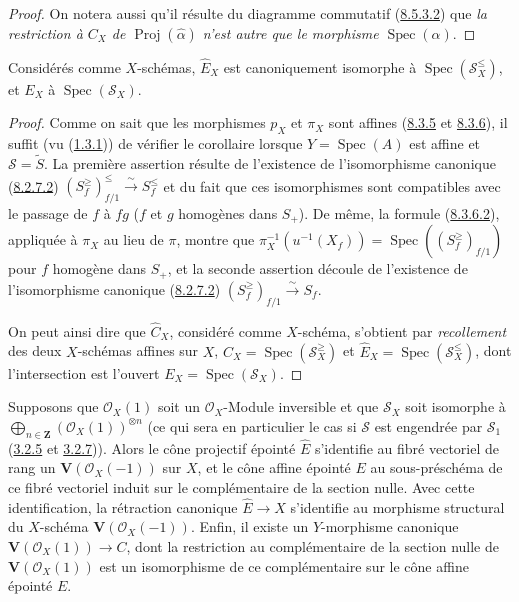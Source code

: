 \begin{proof}
On notera aussi qu'il résulte du diagramme commutatif
(\hyperref[II.8.5.3.2-fr]{8.5.3.2}) que \emph{la restriction à $C_X$ de
$\operatorname{Proj}(\widehat{\alpha})$ n'est autre que le morphisme
$\operatorname{Spec}(\alpha)$}.
\end{proof}

\begin{corollary}[8.6.3]
\label{II.8.6.3-fr}
Considérés comme $X$-schémas, $\widehat{E}_X$ est canoniquement isomorphe à
$\operatorname{Spec}(\mathcal{S}_X^{\leq})$, et $E_X$ à
$\operatorname{Spec}(\mathcal{S}_X)$.
\end{corollary}

\begin{proof}
Comme on sait que les morphismes $p_X$ et $\pi_X$ sont affines
(\hyperref[II.8.3.5-fr]{8.3.5} et
\hyperref[II.8.3.6-fr]{8.3.6}), il suffit (vu
(\hyperref[II.1.3.1-fr]{1.3.1})) de vérifier le corollaire lorsque
$Y=\operatorname{Spec}(A)$ est affine et $\mathcal{S}=\widetilde{S}$. La
première assertion résulte de l'existence de l'isomorphisme canonique
(\hyperref[II.8.2.7.2-fr]{8.2.7.2})
$(S_f^{\geq})_{f/1}^{\leq}\xrightarrow{\sim}S_f^{\leq}$ et du fait que ces
isomorphismes sont compatibles avec le passage de $f$ à $fg$ ($f$ et $g$
homogènes dans $S_+$). De même, la formule
(\hyperref[II.8.3.6.2-fr]{8.3.6.2}), appliquée à $\pi_X$ au lieu de $\pi$,
montre que
$\pi_X^{-1}(u^{-1}(X_f))=
\operatorname{Spec}((S_f^{\geq})_{f/1})$ pour $f$ homogène dans $S_+$, et la
seconde assertion découle de l'existence de l'isomorphisme canonique
(\hyperref[II.8.2.7.2-fr]{8.2.7.2})
$(S_f^{\geq})_{f/1}\xrightarrow{\sim}S_f$.

On peut ainsi dire que $\widehat{C}_X$, considéré comme $X$-schéma, s'obtient
par \emph{recollement} des deux $X$-schémas affines sur $X$,
$C_X=\operatorname{Spec}(\mathcal{S}_X^{\geq})$ et
$\widehat{E}_X=\operatorname{Spec}(\mathcal{S}_X^{\leq})$, dont
l'intersection est l'ouvert $E_X=\operatorname{Spec}(\mathcal{S}_X)$.
\end{proof}

\begin{corollary}[8.6.4]
\label{II.8.6.4-fr}
Supposons que $\mathcal{O}_X(1)$ soit un $\mathcal{O}_X$-Module inversible et
que $\mathcal{S}_X$ soit isomorphe à
$\bigoplus_{n\in\mathbf{Z}}(\mathcal{O}_X(1))^{\otimes n}$ (ce qui sera en
particulier le cas si $\mathcal{S}$ est engendrée par $\mathcal{S}_1$
\textup{(\hyperref[II.3.2.5-fr]{3.2.5}} et
\textup{\hyperref[II.3.2.7-fr]{3.2.7}))}. Alors le cône projectif épointé
$\widehat{E}$ s'identifie au fibré vectoriel de rang un
$\mathbf{V}(\mathcal{O}_X(-1))$ sur $X$, et le cône affine épointé $E$ au
sous-préschéma de ce fibré vectoriel induit sur le complémentaire de la
section nulle. Avec cette identification, la rétraction canonique
$\widehat{E}\to X$ s'identifie au morphisme structural du $X$-schéma
$\mathbf{V}(\mathcal{O}_X(-1))$. Enfin, il existe un $Y$-morphisme canonique
$\mathbf{V}(\mathcal{O}_X(1))\to C$, dont la restriction au complémentaire de
la section nulle de $\mathbf{V}(\mathcal{O}_X(1))$ est un isomorphisme de ce
complémentaire sur le cône affine épointé $E$.
\end{corollary}

